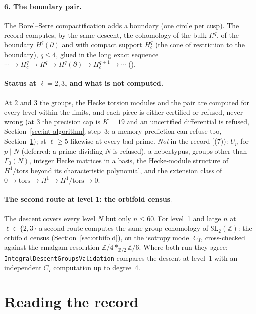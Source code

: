 \documentclass[11pt,openany]{report}
\newcommand{\Z}{\mathbb{Z}}
\newcommand{\SL}{\mathrm{SL}}
\newcommand{\tors}{\mathrm{tors}}
\begin{document}
\paragraph{6. The boundary pair.}
The Borel--Serre compactification adds a boundary (one circle per cusp). The record computes, by the same descent, the
cohomology of the bulk $H^q$, of the boundary $H^q(\partial)$ and with compact support $H^q_c$ (the cone of
restriction to the boundary), $q\le4$, glued in the long exact sequence
$\cdots\to H^q_c\to H^q\to H^q(\partial)\to H^{q+1}_c\to\cdots$ ({}).

\paragraph{Status at \texorpdfstring{$\ell=2,3$}{l=2,3}, and what is not computed.}
At $2$ and $3$ the groups, the Hecke torsion modules and the pair are computed for every level within the limits, and each
piece is either certified or refused, never wrong (at $3$ the precision cap is $K=19$ and an uncertified differential is
refused, Section~\ref{sec:int-algorithm}, step~3; a memory prediction can refuse too, Section~\ref{sec:int-reading}); at
$\ell\ge5$ likewise at every bad prime. \emph{Not} in the record ({}(7)): $U_p$ for
$p\mid N$ (deferred: a prime dividing $N$ is refused), a nebentypus, groups other than $\Gamma_0(N)$, integer Hecke matrices
in a basis, the Hecke-module structure of $H^1/\tors$ beyond its characteristic polynomial, and the extension class of
$0\to\tors\to H^1\to H^1/\tors\to0$.

\paragraph{The second route at level 1: the orbifold census.} The descent covers every level $N$ but only $n\le60$. For
level~1 and large $n$ at $\ell\in\{2,3\}$ a second route computes the same group cohomology of $\SL_2(\Z)$: the orbifold
census (Section~\ref{sec:orbifold}), on the isotropy model $C_I$, cross-checked against the amalgam resolution
$\Z/4*_{\Z/2}\Z/6$. Where both run they agree: \texttt{IntegralDescentGroupsValidation} compares the descent at level~1 with
an independent $C_I$ computation up to degree~4.

\section{Reading the record}\label{sec:int-reading}
\end{document}

